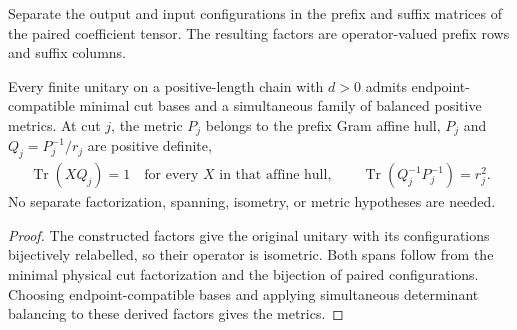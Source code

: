 \begin{definition}
    \label{def:mpu_minimal_operator_factors}
    \leanok
    Separate the output and input configurations in the prefix and
    suffix matrices of the paired coefficient tensor. The resulting
    factors are operator-valued prefix rows and suffix columns.
\end{definition}

\begin{lemma}
    \label{thm:mpu_metrics_from_finite_unitary}
    \leanok
    Every finite unitary on a positive-length chain with $d>0$
    admits endpoint-compatible minimal cut bases and a simultaneous
    family of balanced positive metrics. At cut $j$, the metric
    $P_j$ belongs to the prefix Gram affine hull,
    $P_j$ and $Q_j=P_j^{-1}/r_j$ are positive definite,
    \begin{align}
        \operatorname{Tr}(XQ_j)=1
        \quad\text{for every }X\text{ in that affine hull},
        \qquad
        \operatorname{Tr}(Q_j^{-1}P_j^{-1})=r_j^2.
    \end{align}
    No separate factorization, spanning, isometry, or metric hypotheses
    are needed.
\end{lemma}
\begin{proof}\leanok
    The constructed factors give the original unitary with its
    configurations bijectively relabelled, so their operator is
    isometric. Both spans follow from the minimal physical cut
    factorization and the bijection of paired configurations.
    Choosing endpoint-compatible bases and applying simultaneous
    determinant balancing to these derived factors gives the metrics.
\end{proof}

